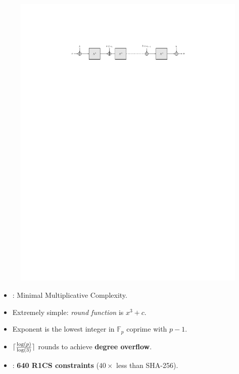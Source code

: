 \documentclass[beamer={10pt,xcolor=dvipsnames},target=mst]{thud}
\begin{document}
\begin{frame}{\Mimc{}~\cite{AlbrechtGRRT2016}}
  \begin{figure}
    \centering
    \includegraphics[scale=0.75]{res/AlbrechtGRRT2016.pdf}
  \end{figure}

  \begin{itemize}
    \item \Mimc{}: Minimal Multiplicative Complexity.
    \item Extremely simple: \emph{round function} is \(x^3 + c\).
    \item Exponent is the lowest integer in \(\mathbb{F}_p\) coprime with \(p - 1\).
    \item \(\lceil\frac{\log\left(p\right)}{\log\left(3\right)}\rceil\) rounds to achieve \textbf{degree overflow}.
    \item {}: \textbf{640 R1CS constraints} (\(40\times \) less than SHA-256).
  \end{itemize}  
\end{frame}
\end{document}

